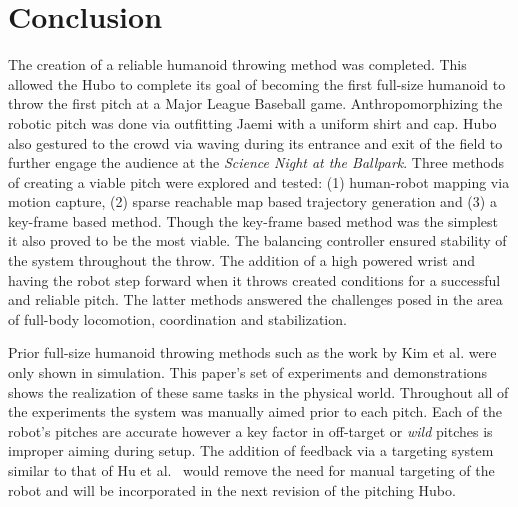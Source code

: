\section{\bf Conclusion}\label{sec:conclusion}
The creation of a reliable humanoid throwing method was completed. 
This allowed the Hubo to complete its goal of becoming the first full-size humanoid to throw the first pitch at a Major League Baseball game.
Anthropomorphizing the robotic pitch was done via outfitting Jaemi with a uniform shirt and cap.
Hubo also gestured to the crowd via waving during its entrance and exit of the field to further engage the audience at the \textit{Science Night at the Ballpark}.
Three methods of creating a viable pitch were explored and tested: (1) human-robot mapping via motion capture, (2) sparse reachable map based trajectory generation and (3) a key-frame based method.  
Though the key-frame based method was the simplest it also proved to be the most viable.  
The balancing controller ensured stability of the system throughout the throw.  
The addition of a high powered wrist and having the robot step forward when it throws created conditions for a successful and reliable pitch.
The latter methods answered the challenges posed in the area of full-body locomotion, coordination and stabilization.

Prior full-size humanoid throwing methods such as the work by Kim et al. \cite{5686315} were only shown in simulation.
This paper's set of experiments and demonstrations shows the realization of these same tasks in the physical world.
Throughout all of the experiments the system was manually aimed prior to each pitch.
Each of the robot's pitches are accurate however a key factor in off-target or \textit{wild} pitches is improper aiming during setup.
The addition of feedback via a targeting system similar to that of Hu et al.~\cite{5649335} would remove the need for manual targeting of the robot and will be incorporated in the next revision of the pitching Hubo.

